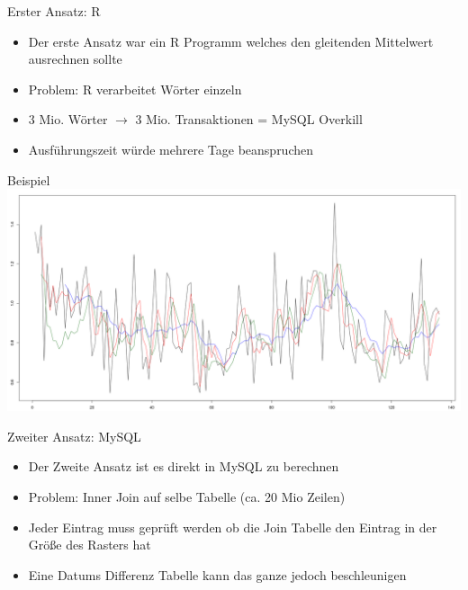 \documentclass{beamer}
\begin{document}
\begin{frame}{Erster Ansatz: R}
	\begin{itemize}
		\item Der erste Ansatz war ein R Programm welches den gleitenden Mittelwert ausrechnen sollte
		\item Problem: R verarbeitet Wörter einzeln 
		\item 3 Mio. Wörter $\rightarrow$ 3 Mio. Transaktionen = MySQL Overkill
		\item Ausführungszeit würde mehrere Tage beanspruchen
	\end{itemize}
\end{frame}

\begin{frame}{Beispiel}
\includegraphics[scale=0.18]{Bilder/R.png}
\end{frame}

\begin{frame}{Zweiter Ansatz: MySQL}
	\begin{itemize}
		\item Der Zweite Ansatz ist es direkt in MySQL zu berechnen
		\item Problem: Inner Join auf selbe Tabelle (ca. 20 Mio Zeilen)
		\item Jeder Eintrag muss geprüft werden ob die Join Tabelle den Eintrag in der Größe des Rasters hat
		\item Eine Datums Differenz Tabelle kann das ganze jedoch beschleunigen

	\end{itemize}
\end{frame}
\end{document}
